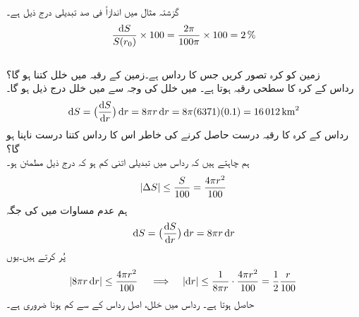 گزشتہ مثال میں  اندازاً  فی صد تبدیلی درج ذیل ہے۔
\begin{align*}
\frac{\dif S}{S(r_0)}\times 100=\frac{2\pi}{100\pi}\times 100=\SI{2}{\percent}
\end{align*} 
\\
زمین کو کرہ تصور کریں جس کا رداس  ہے۔زمین کے رقبہ میں خلل کتنا ہو گا؟\\
رداس  کے کرہ کا سطحی رقبہ  ہوتا ہے۔  میں خلل کی وجہ سے  میں خلل درج ذیل ہو گا۔
\begin{align*}
\dif S=\big(\frac{\dif S}{\dif r}\big)\dif r=8\pi r\dif r=8\pi(6371)(0.1)=\SI{16012}{\kilo\meter\squared}
\end{align*}
رداس  کے کرہ کا رقبہ  درست حاصل کرنے کی خاطر اس کا رداس کتنا درست ناپنا ہو گا؟\\
ہم چاہتے ہیں کہ رداس میں تبدیلی اتنی کم ہو کہ درج ذیل مطمئن  ہو۔
\begin{align*}
\abs{\Delta S}\le \frac{S}{100}=\frac{4\pi r^2}{100}
\end{align*}
ہم   عدم مساوات میں  کی جگہ 
\begin{align*}
\dif S=\big(\frac{\dif S}{\dif r}\big)\dif r=8\pi r\dif r
\end{align*}
پُر کرتے ہیں۔یوں
\begin{align*}
\abs{8\pi r\dif r}\le \frac{4\pi r^2}{100}\quad \implies \quad \abs{\dif r}\le \frac{1}{8\pi r}\cdot \frac{4\pi r^2}{100}=\frac{1}{2}\frac{r}{100}
\end{align*}
حاصل ہوتا ہے۔ رداس میں خلل،  اصل رداس کے  سے کم ہونا ضروری ہے۔

